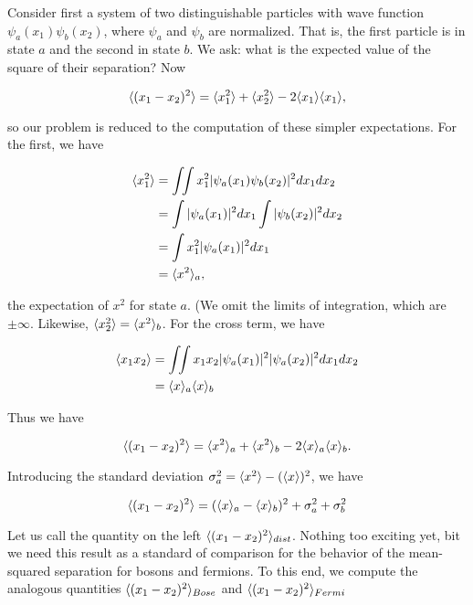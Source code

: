 Consider first a system of two distinguishable particles with wave function $\psi_a(x_1)\psi_b(x_2)$, where $\psi_a$ and $\psi_b$ are normalized.  That is, the first particle is in state $a$ and the second in state $b$.  We ask: what is the expected value of the square of their separation?  Now

\begin{equation}
\langle (x_1 - x_2)^2 \rangle 
  = \langle x_1^2 \rangle
 + \langle x_2^2 \rangle
 - 2 \langle x_1 \rangle\langle x_1 \rangle,
\end{equation}

so our problem is reduced to the computation of these simpler expectations.  For the first, we have

\begin{align}
\langle x_1^2 \rangle 
&= \int\kern-4pt\int x_1^2 |\psi_a(x_1)\psi_b(x_2)|^2 dx_1 dx_2 \\
&= \int |\psi_a(x_1)|^2 dx_1 \int |\psi_b(x_2)|^2  dx_2\\
&= \int x_1^2 |\psi_a(x_1)|^2 dx_1 \\
&= \langle x^2 \rangle_a,
\end{align}

the expectation of $x^2$ for state $a$.  (We omit the limits of integration, which are $\pm \infty$.
Likewise, $\langle x_2^2 \rangle = \langle x^2 \rangle_b$.  For the cross term, we have

\begin{align}
\langle x_1x_2 \rangle &= \int\kern-4pt\int x_1x_2 |\psi_a(x_1)|^2 |\psi_a(x_2)|^2 dx_1 dx_2 \\ 
&= \langle x \rangle_a \langle x \rangle_b 
\end{align}

Thus we have

\begin{equation}
\langle (x_1 - x_2)^2 \rangle = \langle x^2 \rangle_a +  \langle x^2 \rangle_b - 2 \langle x \rangle_a \langle x \rangle_b .
\end{equation}

Introducing the standard deviation $\sigma_a^2 = \langle x^2 \rangle - (\langle x \rangle)^2$, we have

\begin{equation}
\langle (x_1 - x_2)^2 \rangle = (\langle x \rangle_a - \langle x \rangle_b)^2 + \sigma_a^2 + \sigma_b^2
\end{equation}

Let us call the quantity on the left $\langle (x_1 - x_2)^2 \rangle_{dist}$.
Nothing too exciting yet, bit we need this result as a standard of comparison for the behavior of the mean-squared separation for bosons and fermions.  To this end, we compute the analogous quantities 
$\langle (x_1 - x_2)^2 \rangle_{Bose}$ and $\langle (x_1 - x_2)^2 \rangle_{Fermi}$


